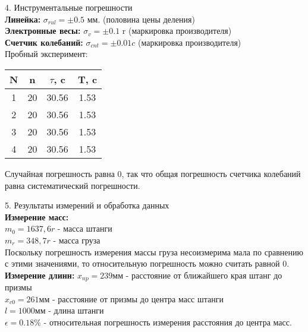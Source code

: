 \documentclass[12pt, a4paper]{article}
\begin{document}
        {\Large 4. Инструментальные погрешности \\}
        \textbf{Линейка: } $\sigma_{rul} = \pm 0.5$ мм. (половина цены деления)\\
        \textbf{Электронные весы: } $\sigma_{v} = \pm 0.1$ r (маркировка производителя) \\
        \textbf{Счетчик колебаний: } $\sigma_{cnt} = \pm 0.01c$ (маркировка производителя) \\
        \newpage
        Пробный эксперимент:
        \begin{center}
            \begin{tabular}{ | c | c | c | c | }
                \hline
                N & n & $\tau$, c & T, c \\ \hline
                1 & 20 & 30.56 & 1.53 \\ \hline
                2 & 20 & 30.56 & 1.53 \\ \hline
                3 & 20 & 30.56 & 1.53 \\ \hline
                4 & 20 & 30.56 & 1.53 \\ \hline
            \end{tabular}
            \end{center} 
        Случайная погрешность равна 0, так что общая погрешность счетчика колебаний равна систематический погрешности.
            
        \vspace*{0.3cm}
        {\Large 5. Результаты измерений и обработка данных \\} 
        {\textbf{Измерение масс:}} \\
        $m_0 = 1637,6r$ - масса штанги \\
        $m_r = 348,7r$ - масса груза \\
        Поскольку погрешность измерения массы груза несоизмерима мала по сравнению с этими значениями, то относительную погрешность можно считать равной 0. \\
        {\textbf{Измерение длинн:}}
        $x_{np} = 239$мм - расстояние от ближайшего края штанг до призмы \\
        $x_{c0} = 261$мм - расстояние от призмы до центра масс штанги \\
        $l = 1000$мм - длина штанги \\
        $\epsilon = 0.18\%$ - относительная погрешность измерения расстояния до центра масс.
        
\end{document}
